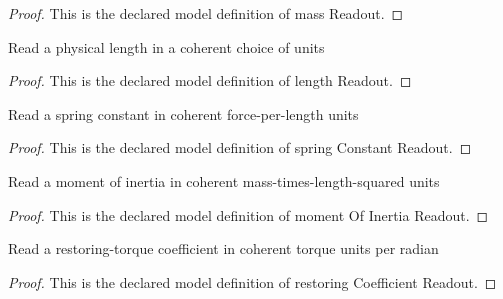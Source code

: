 \begin{proof}
  This is the declared model definition of mass Readout.
\end{proof}
\begin{definition}
  \label{def:physics:phyx-mini-0272:phyxminiproblems-problemphyxmini0272-lengthreadout}
  Read a physical length in a coherent choice of units
\end{definition}
\begin{proof}
  This is the declared model definition of length Readout.
\end{proof}
\begin{definition}
  \label{def:physics:phyx-mini-0272:phyxminiproblems-problemphyxmini0272-springconstantreadout}
  Read a spring constant in coherent force-per-length units
\end{definition}
\begin{proof}
  This is the declared model definition of spring Constant Readout.
\end{proof}
\begin{definition}
  \label{def:physics:phyx-mini-0272:phyxminiproblems-problemphyxmini0272-momentofinertiareadout}
  Read a moment of inertia in coherent mass-times-length-squared units
\end{definition}
\begin{proof}
  This is the declared model definition of moment Of Inertia Readout.
\end{proof}
\begin{definition}
  \label{def:physics:phyx-mini-0272:phyxminiproblems-problemphyxmini0272-restoringcoefficientreadout}
  Read a restoring-torque coefficient in coherent torque units per radian
\end{definition}
\begin{proof}
  This is the declared model definition of restoring Coefficient Readout.
\end{proof}
